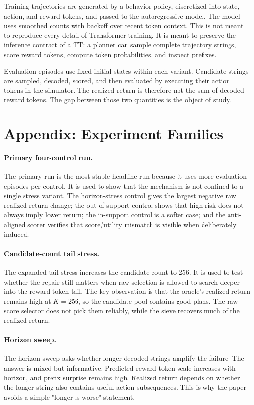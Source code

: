 \documentclass{article}
\begin{document}
Training trajectories are generated by a behavior policy, discretized into state, action, and reward tokens, and passed to the autoregressive model. The model uses smoothed counts with backoff over recent token context. This is not meant to reproduce every detail of Transformer training. It is meant to preserve the inference contract of a TT: a planner can sample complete trajectory strings, score reward tokens, compute token probabilities, and inspect prefixes.

Evaluation episodes use fixed initial states within each variant. Candidate strings are sampled, decoded, scored, and then evaluated by executing their action tokens in the simulator. The realized return is therefore not the sum of decoded reward tokens. The gap between those two quantities is the object of study.

\section{Appendix: Experiment Families}

\paragraph{Primary four-control run.}
The primary run is the most stable headline run because it uses more evaluation episodes per control. It is used to show that the mechanism is not confined to a single stress variant. The horizon-stress control gives the largest negative raw realized-return change; the out-of-support control shows that high risk does not always imply lower return; the in-support control is a softer case; and the anti-aligned scorer verifies that score/utility mismatch is visible when deliberately induced.

\paragraph{Candidate-count tail stress.}
The expanded tail stress increases the candidate count to 256. It is used to test whether the repair still matters when raw selection is allowed to search deeper into the reward-token tail. The key observation is that the oracle's realized return remains high at \(K=256\), so the candidate pool contains good plans. The raw score selector does not pick them reliably, while the sieve recovers much of the realized return.

\paragraph{Horizon sweep.}
The horizon sweep asks whether longer decoded strings amplify the failure. The answer is mixed but informative. Predicted reward-token scale increases with horizon, and prefix surprise remains high. Realized return depends on whether the longer string also contains useful action subsequences. This is why the paper avoids a simple "longer is worse" statement.
\end{document}
